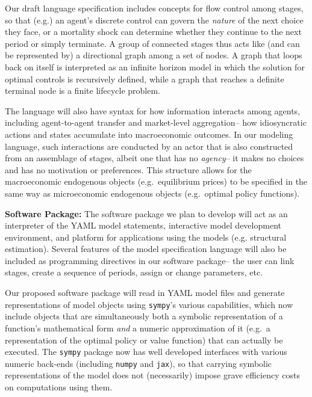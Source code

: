 \documentclass[12pt,pdftex,letterpaper]{article}
\begin{document}
Our draft language specification includes concepts for flow control among stages, so that (e.g.) an agent's discrete control can govern the \textit{nature} of the next choice they face, or a mortality shock can determine whether they continue to the next period or simply terminate. A group of connected stages thus acts like (and can be represented by) a directional graph among a set of nodes. A graph that loops back on itself is interpreted as an infinite horizon model in which the solution for optimal controls is recursively defined, while a graph that reaches a definite terminal node is a finite lifecycle problem.

The language will also have syntax for how information interacts among agents, including agent-to-agent transfer and market-level aggregation-- how idiosyncratic actions and states accumulate into macroeconomic outcomes. In our modeling language, such interactions are conducted by an actor that is also constructed from an assemblage of stages, albeit one that has no \textit{agency}-- it makes no choices and has no motivation or preferences. This structure allows for the macroeconomic endogenous objects (e.g.\ equilibrium prices) to be specified in the same way as microeconomic endogenous objects (e.g.\ optimal policy functions).

\vspace{0.5cm}

\noindent \textbf{Software Package:} The software package we plan to develop will act as an interpreter of the YAML model statements, interactive model development environment, and platform for applications using the models (e.g. structural estimation). Several features of the model specification language will also be included as programming directives in our software package-- the user can link stages, create a sequence of periods, assign or change parameters, etc.

Our proposed software package will read in YAML model files and generate representations of model objects using \texttt{sympy}'s various capabilities, which now include objects that are simultaneously both a symbolic representation of a function's mathematical form \textit{and} a numeric approximation of it (e.g.\ a representation of the optimal policy or value function) that can actually be executed. The \texttt{sympy} package now has well developed interfaces with various numeric back-ends (including \texttt{numpy} and \texttt{jax}), so that carrying symbolic representations of the model does not (necessarily) impose grave efficiency costs on computations using them.
\end{document}
